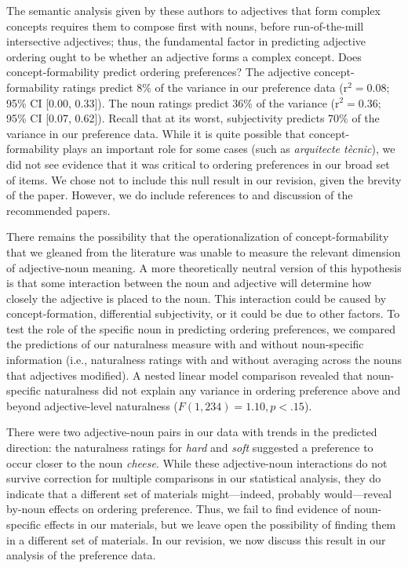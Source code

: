 \documentclass[12pt]{article}
\begin{document}
The semantic analysis given by these authors to adjectives that form complex concepts requires them to compose first with nouns, before run-of-the-mill intersective adjectives; thus, the fundamental factor in predicting adjective ordering ought to be whether an adjective forms a complex concept. Does concept-formability predict ordering preferences?
The adjective concept-formability ratings predict 8\% of the variance in our preference data (r$^{2}=0.08$; 95\% CI [0.00,  0.33]). The noun ratings predict 36\% of the variance (r$^{2}=0.36$; 95\% CI [0.07,  0.62]). Recall that at its worst, subjectivity predicts 70\% of the variance in our preference data.
While it is quite possible that concept-formability plays an important role for some cases (such as \emph{arquitecte t\`{e}cnic}), we did not see evidence that it was critical to ordering preferences in our broad set of items. We chose not to include this null result in our revision, given the brevity of the paper. 
However, we do include references to and discussion of the recommended papers. 

There remains the possibility that the operationalization of concept-formability that we gleaned from the literature was unable to measure the relevant dimension of adjective-noun meaning. A more theoretically neutral version of this hypothesis is that some interaction between the noun and adjective will determine how closely the adjective is placed to the noun. This interaction could be caused by concept-formation, differential subjectivity, or it could be due to other factors. To test the role of the specific noun in predicting ordering preferences, we compared the predictions of our naturalness measure with and without noun-specific information (i.e., naturalness ratings with and without averaging across the nouns that adjectives modified). A nested linear model comparison revealed that noun-specific naturalness did not explain any variance in ordering preference above and beyond adjective-level naturalness ($F(1,234) = 1.10, p < .15$). 

There were two adjective-noun pairs in our data with trends in the predicted direction: the naturalness ratings for \emph{hard} and \emph{soft} suggested a preference to occur closer to the noun \emph{cheese}. While these adjective-noun interactions do not survive correction for multiple comparisons in our statistical analysis, they do indicate that a different set of materials might---indeed, probably would---reveal by-noun effects on ordering preference.  Thus, we fail to find evidence of noun-specific effects in our materials, but we leave open the possibility of finding them in a different set of materials. In our revision, we now discuss this result in our analysis of the preference data.
\end{document}
